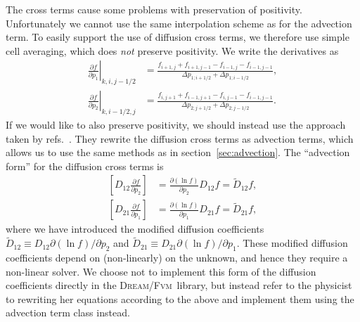 \documentclass{notes}
\newcommand{\DREAM}{\textsc{Dream}}
\newcommand{\FVM}{\textsc{Fvm}}
\begin{document}
    The cross terms cause some problems with preservation of positivity.
    Unfortunately we cannot use the same interpolation scheme as for the
    advection term. To easily support the use of diffusion cross terms, we
    therefore use simple cell averaging, which does \emph{not} preserve
    positivity. We write the derivatives as
    \begin{equation}
        \begin{aligned}
            \left.\frac{\partial f}{\partial p_1}\right|_{k,i,j-1/2} &=
                \frac{f_{i+1,j} + f_{i+1,j-1} - f_{i-1,j} - f_{i-1,j-1}}
                {\Delta p_{1;i+1/2} + \Delta p_{1;i-1/2}},\\
            \left.\frac{\partial f}{\partial p_2}\right|_{k,i-1/2,j} &=
                \frac{f_{i,j+1} + f_{i-1,j+1} - f_{i,j-1} - f_{i-1,j-1}}
                {\Delta p_{2;j+1/2} + \Delta p_{2;j-1/2}}.
        \end{aligned}
    \end{equation}
    If we would like to also preserve positivity, we should instead use the
    approach taken by refs.~\cite{DuToit2018,Daniel2019}. They rewrite the
    diffusion cross terms as advection terms, which allows us to use the same
    methods as in section~\ref{sec:advection}. The ``advection form'' for the
    diffusion cross terms is
    \begin{equation}
        \begin{aligned}
            \left[ D_{12}\frac{\partial f}{\partial p_2} \right] &=
                \frac{\partial (\ln f)}{\partial p_2}D_{12} f = \tilde{D}_{12} f,\\
            \left[ D_{21}\frac{\partial f}{\partial p_1} \right] &=
                \frac{\partial (\ln f)}{\partial p_1}D_{21} f = \tilde{D}_{21} f,
        \end{aligned}
    \end{equation}
    where we have introduced the modified diffusion coefficients
    $\tilde{D}_{12}\equiv D_{12}\partial(\ln f)/\partial p_2$ and
    $\tilde{D}_{21}\equiv D_{21}\partial(\ln f)/\partial p_1$. These modified
    diffusion coefficients depend on (non-linearly) on the unknown, and hence
    they require a non-linear solver. We choose not to implement this form of
    the diffusion coefficients directly in the \DREAM/\FVM\ library, but instead
    refer to the physicist to rewriting her equations according to the above
    and implement them using the advection term class instead.
\end{document}
